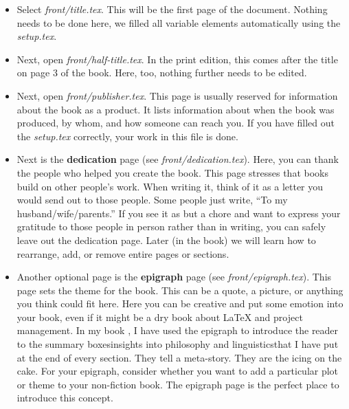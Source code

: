 \begin{itemize}
    \item Select \textit{front/title.tex}. This will be the first page of the document. Nothing needs to be done here, we filled all variable elements automatically using the \textit{setup.tex}.

    \item Next, open \textit{front/half-title.tex}. In the print edition, this comes after the title on page 3 of the book. Here, too, nothing further needs to be edited.

    \item Next, open \textit{front/publisher.tex}. This page is usually reserved for information about the book as a product. It lists information about when the book was produced, by whom, and how someone can reach you. If you have filled out the \textit{setup.tex} correctly, your work in this file is done.

    \item Next is the \textbf{dedication} page (see \textit{front/dedication.tex}). Here, you can thank the people who helped you create the book. This page stresses that books build on other people's work. When writing it, think of it as a letter you would send out to those people. Some people just write, ``To my husband/wife/parents.'' If you see it as but a chore and want to express your gratitude to those people in person rather than in writing, you can safely leave out the dedication page. Later (in the book) we will learn how to rearrange, add, or remove entire pages or sections.

    \item Another optional page is the \textbf{epigraph} page (see \textit{front/epigraph.tex}). This page sets the theme for the book. This can be a quote, a picture, or anything you think could fit here. Here you can be creative and put some emotion into your book, even if it might be a dry book about LaTeX and project management. In my book , I have used the epigraph to introduce the reader to the summary boxes\emdash{}insights into philosophy and linguistics\emdash{}that I have put at the end of every section. They tell a meta-story. They are the icing on the cake. For your epigraph, consider whether you want to add a particular plot or theme to your non-fiction book. The epigraph page is the perfect place to introduce this concept.


\end{itemize}
